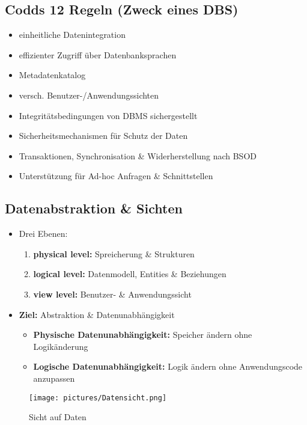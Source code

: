 \documentclass[12pt,a4paper]{article}
\begin{document}
\subsection{Codds 12 Regeln (Zweck eines DBS)}

\begin{itemize}
\item einheitliche Datenintegration
\item effizienter Zugriff über Datenbanksprachen
\item Metadatenkatalog
\item versch. Benutzer-/Anwendungssichten
\item Integritätsbedingungen von DBMS sichergestellt
\item Sicherheitsmechanismen für Schutz der Daten
\item Transaktionen, Synchronisation \& Widerherstellung nach BSOD
\item Unterstützung für Ad-hoc Anfragen \& Schnittstellen
\end{itemize}

\subsection{Datenabstraktion \& Sichten}

\begin{itemize}
\item Drei Ebenen:
\begin{enumerate}
\item \textbf{physical level:} Spreicherung \& Strukturen
\item \textbf{logical level:} Datenmodell, Entities \& Beziehungen
\item \textbf{view level:} Benutzer- \& Anwendungssicht
\end{enumerate}
\item \textbf{Ziel:} Abstraktion \& Datenunabhängigkeit
\begin{itemize}
\item \textbf{Physische Datenunabhängigkeit:} Speicher ändern ohne Logikänderung
\item \textbf{Logische Datenunabhängigkeit:} Logik ändern ohne Anwendungscode anzupassen
\end{itemize}
\end{itemize}

\begin{figure}[H]
\centering
\texttt{[image: pictures/Datensicht.png]}
\caption{Sicht auf Daten}
\end{figure}
\end{document}
